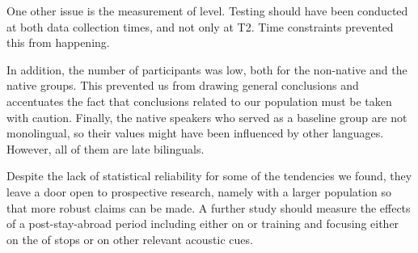 \documentclass[output=paper]{langsci/langscibook}
\begin{document}
One other issue is the measurement of  level. Testing should have been conducted at both data collection times, and not only at T2. Time constraints prevented this from happening. 



In addition, the number of participants was low, both for the non-native and the native groups. This prevented us from drawing general conclusions and accentuates the fact that conclusions related to our population must be taken with caution. Finally, the native speakers who served as a baseline group are not monolingual, so their  values might have been influenced by other languages. However, all of them are late bilinguals.



  Despite the lack of statistical reliability for some of the tendencies we found, they leave a door open to prospective research, namely with a larger population so that more robust claims can be made. A further study should measure the effects of a post-stay-abroad  period including either  on   or   training and focusing either on the  of  stops or on other relevant acoustic cues.


 
\sloppy
\printbibliography[heading=subbibliography,notkeyword=this] 
\end{document}
